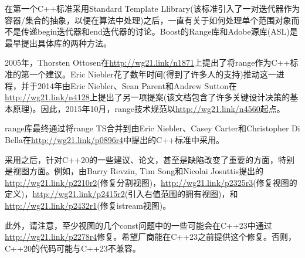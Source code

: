 在第一个C++标准采用Standard Template Llibrary(该标准引入了一对迭代器作为容器/集合的抽象，以便在算法中处理)之后，一直有关于如何处理单个范围对象而不是传递begin迭代器和end迭代器的讨论。Boost的Range库和Adobe源库(ASL)是最早提出具体库的两种方法。

2005年，Thorsten Ottosen在\url{http://wg21.link/n1871}上提出了将range作为C++标准的第一个建议。Eric Niebler花了数年时间(得到了许多人的支持)推动这一进程，并于2014年由Eric Niebler、Sean Parent和Andrew Sutton在\url{http://wg21.link/n4128}上提出了另一项提案(该文档包含了许多关键设计决策的基本原理)。因此，2015年10月，range技术规范以\url{http://wg21.link/n4560}起点。

range库最终通过将range TS合并到由Eric Niebler、Casey Carter和Christopher Di Bella在\url{http://wg21.link/p0896r4}中提出的C++标准中采用。

采用之后，针对C++20的一些建议、论文，甚至是缺陷改变了重要的方面，特别是视图方面。例如，由Barry Revzin, Tim Song和Nicolai Josuttis提出的\url{http://wg21.link/p2210r2}(修复分割视图)，\url{http://wg21.link/p2325r3}(修复视图的定义)，\url{http://wg21.link/p2415r2}(引入右值范围的拥有视图)，和\url{http://wg21.link/p2432r1}(修复istream视图)。

此外，请注意，至少视图的几个const问题中的一些可能会在C++23中通过\url{http://wg21.link/p2278r4}修复。希望厂商能在C++23之前提供这个修复。否则，C++20的代码可能与C++23不兼容。